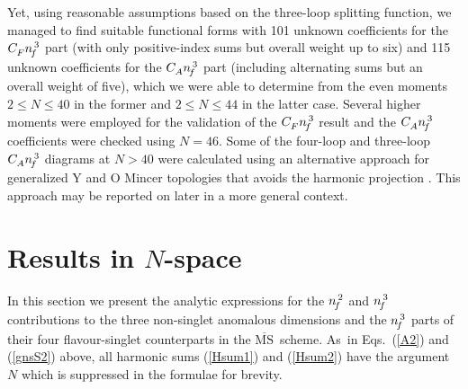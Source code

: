 \documentclass[12pt]{article}
\newcommand{\MSb}{$\overline{\mbox{MS}}$}
\begin{document}
Yet, using reasonable assumptions based on the three-loop splitting function,
we managed to find suitable functional forms with 101 unknown coefficients 
for the ${C^{}_F} {n^{\,3}_{\! f}}$ part (with only positive-index sums but overall 
weight up to six) and 115 unknown coefficients for the ${C^{}_A} {n^{\,3}_{\! f}}$ part 
(including alternating sums but an overall weight of five), which we were 
able to determine from the even moments $2 \leq N \leq 40$ in the former and 
$2 \leq N \leq 44$ in the latter case. Several higher moments were employed
for the validation of the ${C^{}_F} {n^{\,3}_{\! f}}$ result and the ${C^{}_A} {n^{\,3}_{\! f}}$ coefficients 
were checked using $N = 46$. Some of the four-loop and three-loop ${C^{}_A} {n^{\,3}_{\! f}}$ 
diagrams at $N > 40$ were calculated using an alternative approach 
for generalized Y and  O {\sc Mincer} topologies that avoids the harmonic 
projection \cite{MINCER2}. 
This approach may be reported on later in a more general context.

%
\setcounter{equation}{0}
\section{Results in $N$-space}
\label{sec:Nres}

In this section we present the analytic expressions for the ${n^{\,2}_{\! f}}$ and 
${n^{\,3}_{\! f}}$ contributions to the three non-singlet anomalous dimensions and
the ${n^{\,3}_{\! f}}$ parts of their four flavour-singlet counterparts in the
\MSb\ scheme.
As~in Eqs.~(\ref{A2}) and (\ref{gnsS2}) above, all harmonic sums 
(\ref{Hsum1}) and (\ref{Hsum2}) have the argument $N$ which is suppressed 
in the formulae for brevity.
\end{document}
